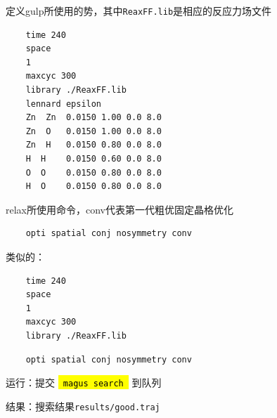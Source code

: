 \documentclass[12pt]{article}
\newcommand{\code}[1]{
  \begingroup
  \sethlcolor{Seashell}
  {\hl{\texttt{~#1~}}}
  \endgroup
}
\newcommand{\file}[1]{\texttt{#1}}
\begin{document}
\begin{tcolorbox}[enhanced, breakable, title=\file{Gulp1/gpot}]
定义gulp所使用的势，其中\file{ReaxFF.lib}是相应的反应力场文件
\tcblower
\begin{verbatim} 
    time 240                                                                                                                    
    space
    1
    maxcyc 300 
    library ./ReaxFF.lib
    lennard epsilon
    Zn  Zn  0.0150 1.00 0.0 8.0 
    Zn  O   0.0150 1.00 0.0 8.0 
    Zn  H   0.0150 0.80 0.0 8.0 
    H  H    0.0150 0.60 0.0 8.0 
    O  O    0.0150 0.80 0.0 8.0 
    H  O    0.0150 0.80 0.0 8.0
\end{verbatim}
\end{tcolorbox}
\begin{tcolorbox}[enhanced, breakable, title=\file{Gulp1/goption.relax}]
relax所使用命令，conv代表第一代粗优固定晶格优化
\tcblower
\begin{verbatim} 
    opti spatial conj nosymmetry conv
\end{verbatim}
\end{tcolorbox}   
%
类似的：
\begin{tcolorbox}[enhanced, breakable, title=\file{Gulp2/gpot}]
\begin{verbatim} 
    time 240                                                                                                                    
    space
    1
    maxcyc 300 
    library ./ReaxFF.lib
\end{verbatim}
\end{tcolorbox}
\begin{tcolorbox}[enhanced, breakable, title=\file{Gulp1/goption.relax}]
\begin{verbatim} 
    opti spatial conj nosymmetry conv
\end{verbatim}
\end{tcolorbox}
运行：提交\code{magus search}到队列\par
结果：搜索结果\file{results/good.traj}
\end{document}
